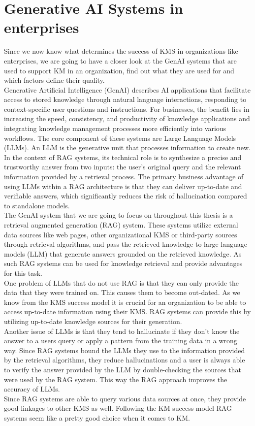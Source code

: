 \documentclass[
	english,
	ruledheaders=section,%
	class=report,%
	thesis={type=bachelor},%
	accentcolor=1b,%
	custommargins=true,%
	marginpar=false,%
	parskip=half-,%
	fontsize=11pt,%
	DIV=14,
]{tudapub}
\begin{document}
\section{Generative AI Systems in enterprises}
Since we now know what determines the success of KMS in organizations like enterprises, we are going to have a closer look at the GenAI systems that are used to support KM in an organization, find out what they are used for and which factors define their quality.\\
Generative Artificial Intelligence (GenAI) describes AI applications that facilitate access to stored knowledge through natural language interactions, responding to context-specific user questions and instructions. For businesses, the benefit lies in increasing the speed, consistency, and productivity of knowledge applications and integrating knowledge management processes more efficiently into various workflows. The core component of these systems are Large Language Models (LLMs). An LLM is the generative unit that processes information to create new. In the context of RAG systems, its technical role is to synthesize a precise and trustworthy answer from two inputs: the user's original query and the relevant information provided by a retrieval process. The primary business advantage of using LLMs within a RAG architecture is that they can deliver up-to-date and verifiable answers, which significantly reduces the risk of hallucination compared to standalone models.\\
The GenAI system that we are going to focus on throughout this thesis is a retrieval augmented generation (RAG) system. These systems utilize external data sources like web pages, other organizational KMS or third-party sources through retrieval algorithms, and pass the retrieved knowledge to large language models (LLM) that generate answers grounded on the retrieved knowledge. As such RAG systems can be used for knowledge retrieval and provide advantages for this task.\\
One problem of LLMs that do not use RAG is that they can only provide the data that they were trained on. This causes them to become out-dated. As we know from the KMS success model it is crucial for an organization to be able to access up-to-date information using their KMS. RAG systems can provide this by utilizing up-to-date knowledge sources for their generation.\\
Another issue of LLMs is that they tend to hallucinate if they don't know the answer to a users query or apply a pattern from the training data in a wrong way. Since RAG systems bound the LLMs they use to the information provided by the retrieval algorithms, they reduce hallucinations and a user is always able to verify the answer provided by the LLM by double-checking the sources that were used by the RAG system. This way the RAG approach improves the accuracy of LLMs.\\
Since RAG systems are able to query various data sources at once, they provide good linkages to other KMS as well. Following the KM success model RAG systems seem like a pretty good choice when it comes to KM.\\
\end{document}
